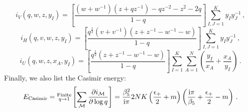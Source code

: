 \documentclass[main.tex]{subfiles}
\begin{document}
\begin{equation}
i_V(q,w,z,y_I)=\left[\frac{\left(w+w^{-1}\right)\left(z+qz^{-1}\right)-qz^{-2}-z^2-2q}{1-q}\right]\sum_{I,J=1}^Ky_Iy_J^{-1}\,,
\end{equation}
\begin{equation}
i_H(q,v,w,z,y_I)=\left[\frac{q^{\frac{1}{2}}\left(v+v^{-1}\right)\left(z+z^{-1}-w^{-1}-w\right)}{1-q}\right]\sum_{I,J=1}^Ky_Iy_J^{-1}\,,
\end{equation}
\begin{equation}
i_U(q,w,z,x_A,y_I)=\left[\frac{q^{\frac{1}{2}}\left(z+z^{-1}-w^{-1}-w\right)}{1-q}\right]\sum_{I=1}^K\sum_{A=1}^N\left(\frac{y_I}{x_A}+\frac{x_A}{y_I}\right)\,.
\end{equation}
Finally, we also list the Casimir energy:
\begin{equation}
E_{\text{Casimir}}=\substack{\text{Finite}\\q\to1}\left[\sum_{\mathcal{M}}\frac{\partial i_{\mathcal{ M}}}{\partial\log q}\right]=\frac{\beta^2_5}{\mathrm{i}\pi}2NK\left(\frac{\epsilon_+}{2}+m\right)\left(\frac{\mathrm{i}\pi}{\beta_5}+\frac{\epsilon_+}{2}-m\right)\label{eqn:Casimir1} \,.
\end{equation}
\end{document}
